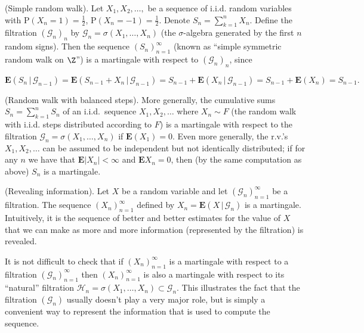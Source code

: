 \begin{example}
(Simple random walk). Let $X_1, X_2, \ldots,$ be a
sequence of i.i.d. random variables with
$\mathrm{P}(X_n=1)=\tfrac12$,
$\mathrm{P}(X_n=-1)=\tfrac12$. Denote
$S_n = \sum_{k=1}^n X_n$. Define the filtration
$(\mathcal{G}_n)_n$ by
$\mathcal{G}_n = \sigma(X_1,\ldots,X_n)$ (the
$\sigma$-algebra generated by the first $n$ random
signs). Then the sequence $(S_n)_{n=1}^\infty$ (known
as ``simple symmetric random walk on $\Z$'') is a
martingale with respect to $(\mathcal{G}_n)_n$, since

\[
\mathbf{E}\left(S_n\,|\,\mathcal{G}_{n-1}\right) = \mathbf{E}\left(S_{n-1}+X_n\,|\,\mathcal{G}_{n-1}\right)
= S_{n-1} + \mathbf{E}\left(X_n\,|\,\mathcal{G}_{n-1}\right) = S_{n-1} + \mathbf{E}(X_n) = S_{n-1}.
\]

\end{example}

\begin{example}
(Random walk with balanced steps). More generally,
the cumulative sums $S_n=\sum_{k=1}^n S_n$ of an
i.i.d.\ sequence $X_1,X_2,\ldots$ where $X_n\sim F$
(the random walk with i.i.d. steps distributed
according to $F$) is a martingale with respect to the
filtration $\mathcal{G}_n=\sigma(X_1,\ldots,X_n)$ if
$\mathbf{E}(X_1)=0$. Even more generally, the r.v.'s
$X_1,X_2,\ldots$ can be assumed to be independent but
not identically distributed; if for any $n$ we have
that $\mathbf{E}|X_n|<\infty$ and
$\mathbf{E} X_n = 0$, then (by the same computation
as above) $S_n$ is a martingale.
\end{example}

\begin{example}
(Revealing information). Let $X$ be a random variable
and let $(\mathcal{G}_n)_{n=1}^\infty$ be a
filtration. The sequence $(X_n)_{n=1}^\infty$ defined
by $X_n = \mathbf{E}\left(X\,|\,\mathcal{G}_n\right)$
is a martingale. Intuitively, it is the sequence of
better and better estimates for the value of $X$ that
we can make as more and more information (represented
by the filtration) is revealed.
\end{example}

\noindent It is not difficult to check that if
$(X_n)_{n=1}^\infty$ is a martingale with respect to
a filtration $(\mathcal{G}_n)_{n=1}^\infty$ then
$(X_n)_{n=1}^\infty$ is also a martingale with
respect to its ``natural'' filtration
$\mathcal{H}_n=\sigma(X_1,\ldots,X_n) \subset
\mathcal{G}_n$.
This illustrates the fact that the filtration
$(\mathcal{G}_n)$ usually doesn't play a very major
role, but is simply a convenient way to represent the
information that is used to compute the sequence.


